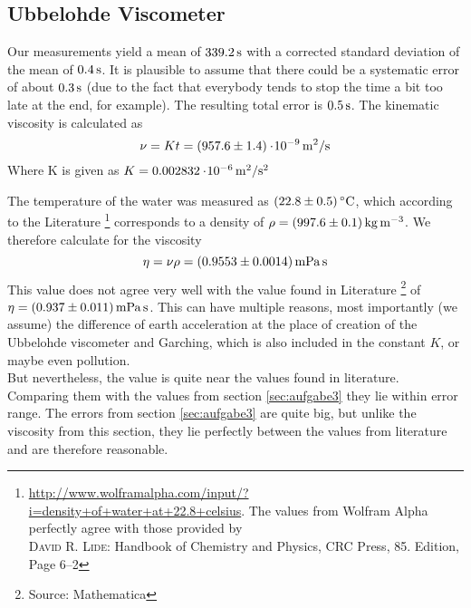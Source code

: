 \subsection{Ubbelohde Viscometer} \label{sec:aufgabe1}
Our measurements yield a mean of $\unit[339.2]{s}$ with a corrected standard deviation of the mean of $\unit[0.4]{s}$. It is plausible to assume that there could be a systematic error of about $\unit[0.3]{s}$ (due to the fact that everybody tends to stop the time a bit too late at the end, for example). The resulting total error is $\unit[0.5]{s}$. The kinematic viscosity is calculated as
\[
    \nu = K t = \unit[(957.6 \pm 1.4)\e{-9}]{m^2/s}
\]
Where K is given as $K = \unit[0.002832\e{-6}]{m^2/s^2}$

The temperature of the water was measured as $(22.8 \pm 0.5)\C$, which according to the Literature%
\footnote{\url{http://www.wolframalpha.com/input/?i=density+of+water+at+22.8+celsius}. The values from Wolfram Alpha perfectly agree with those provided by \\ \textsc{David R. Lide}: Handbook of Chemistry and Physics, CRC Press, 85. Edition, Page 6--2}
corresponds to a density of $\rho = \unit[(997.6 \pm 0.1)]{kg\,m^{-3}}$. We therefore calculate for the viscosity
\[
    \eta =  \nu \rho = \unit[(0.9553 \pm0.0014)]{mPa\,s}
\]
This value does not agree very well with the value found in Literature%
\footnote{Source: Mathematica}
of $\eta = \unit[(0.937 \pm 0.011)]{mPa\, s}$. This can have multiple reasons, most importantly (we assume) the difference of earth acceleration at the place of creation of the Ubbelohde viscometer and Garching, which is also included in the constant $K$, or maybe even pollution.\\
But nevertheless, the value is quite near the values found in literature. Comparing them with the values from section \ref{sec:aufgabe3} they lie within error range. The errors from section \ref{sec:aufgabe3} are quite big, but unlike the viscosity from this section, they lie perfectly between the values from literature and are therefore reasonable.
